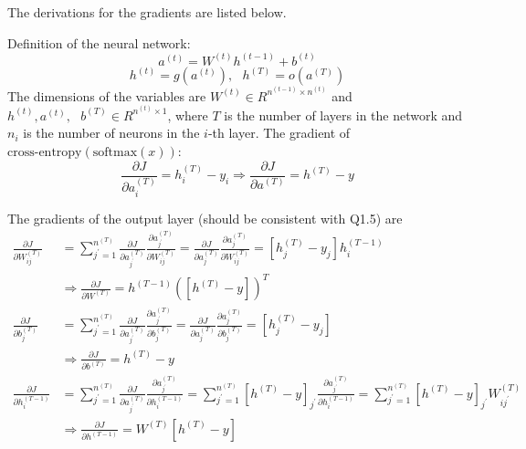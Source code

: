 \documentclass{article} %
\begin{document}
    The derivations for the gradients are listed below.

    Definition of the neural network:
    $$a^{\left(t\right)}=W^{\left(t\right)}h^{\left(t - 1\right)}+b^{\left(t\right)}$$
    $$h^{\left(t\right)}=g\left(a^{\left(t\right)}\right),\textrm{ }h^{\left(T\right)}=o\left(a^{\left(T\right)}\right)$$
    The dimensions of the variables are $W^{\left(t\right)}\in R^{n^{\left(t - 1\right)} \times n^{\left(t\right)}}$ and $h^{\left(t\right)},a^{\left(t\right)},\textrm{ }b^{\left(T\right)}\in R^{n^{\left(t\right)} \times 1}$, where $T$ is the number of layers in the network and $n_i$ is the number of neurons in the $i$-th layer. The gradient of $\text{cross-entropy}(\text{softmax}(x))$:
    $$\frac{\partial J}{\partial a_{i}^{\left(T\right)}}=h_{i}^{\left(T\right)}-y_{i}\Longrightarrow\frac{\partial J}{\partial a^{\left(T\right)}}=h^{\left(T\right)}-y$$

    The gradients of the output layer (should be consistent with Q1.5) are
    $$
    \begin{aligned}
    \frac{\partial J}{\partial W_{i j}^{\left(T\right)}}&=\sum_{j^{'} = 1}^{n^{\left(T\right)}} \frac{\partial J}{\partial a_{j^{'}}^{\left(T\right)}} \frac{\partial a_{j^{'}}^{\left(T\right)}}{\partial W_{i j}^{\left(T\right)}}=\frac{\partial J}{\partial a_{j}^{\left(T\right)}}\frac{\partial a_{j}^{\left(T\right)}}{\partial W_{i j}^{\left(T\right)}}=\left[h_{j}^{\left(T\right)} - y_{j}\right]h_{i}^{\left(T - 1\right)}&\\&\Longrightarrow\frac{\partial J}{\partial W^{\left(T\right)}}=h^{\left(T - 1\right)}\left(\left[h^{\left(T\right)} - y\right]\right)^{T}\\
    \frac{\partial J}{\partial b_{j}^{\left(T\right)}}&=\sum_{j^{'} = 1}^{n^{\left(T\right)}} \frac{\partial J}{\partial a_{j^{'}}^{\left(T\right)}} \frac{\partial a_{j^{'}}^{\left(T\right)}}{\partial b_{j}^{\left(T\right)}}=\frac{\partial J}{\partial a_{j}^{\left(T\right)}}\frac{\partial a_{j}^{\left(T\right)}}{\partial b_{j}^{\left(T\right)}}=\left[h_{j}^{\left(T\right)} - y_{j}\right]&\\&\Longrightarrow\frac{\partial J}{\partial b^{\left(T\right)}}=h^{\left(T\right)}-y\\
    \frac{\partial J}{\partial h_{i}^{\left(T - 1\right)}}&=\sum_{j^{'} = 1}^{n^{\left(T\right)}} \frac{\partial J}{\partial a_{j^{'}}^{\left(T\right)}} \frac{\partial a_{j^{'}}^{\left(T\right)}}{\partial h_{i}^{\left(T - 1\right)}}=\sum_{j^{'} = 1}^{n^{\left(T\right)}}\left[h^{\left(T\right)} - y\right]_{j^{'}} \frac{\partial a_{j^{'}}^{\left(T\right)}}{\partial h_{i}^{\left(T - 1\right)}}=\sum_{j^{'} = 1}^{n^{\left(T\right)}}\left[h^{\left(T\right)} - y\right]_{j^{'}} W_{i j^{'}}^{\left(T\right)}&\\&\Longrightarrow\frac{\partial J}{\partial h^{\left(T - 1\right)}}=W^{\left(T\right)}\left[h^{\left(T\right)} - y\right]
    \end{aligned}
    $$
\end{document}
